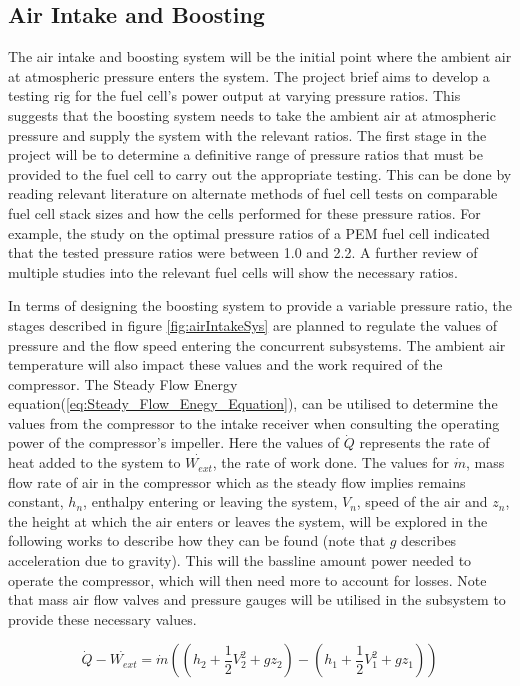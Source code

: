 \documentclass[a4paper,11pt]{article}
\begin{document}
\subsection{Air Intake and Boosting}
The air intake and boosting system will be the initial point where the ambient air at atmospheric pressure enters the system. The project brief aims to develop a testing rig for the fuel cell's power output at varying pressure ratios. This suggests that the boosting system needs to take the ambient air at atmospheric pressure and supply the system with the relevant ratios. The first stage in the project will be to determine a definitive range of pressure ratios that must be provided to the fuel cell to carry out the appropriate testing. This can be done by reading relevant literature on alternate methods of fuel cell tests on comparable fuel cell stack sizes and how the cells performed for these pressure ratios. For example, the study on the optimal pressure ratios of a PEM fuel cell\cite{hoeflinger2020air} indicated that the tested pressure ratios were between 1.0 and 2.2. A further review of multiple studies into the relevant fuel cells will show the necessary ratios.

In terms of designing the boosting system to provide a variable pressure ratio, the stages described in figure \ref{fig:airIntakeSys} are planned to regulate the values of pressure and the flow speed entering the concurrent subsystems. The ambient air temperature will also impact these values and the work required of the compressor. The Steady Flow Energy equation(\ref{eq:Steady_Flow_Enegy_Equation}), can be utilised to determine the values from the compressor to the intake receiver when consulting the operating power of the compressor's impeller. Here the values of $\dot{Q}$ represents the rate of heat added to the system to $\dot{W_{ext}}$, the rate of work done. The values for $\dot{m}$, mass flow rate of air in the compressor which as the steady flow implies remains constant, $h_n$, enthalpy entering or leaving the system, $V_n$, speed of the air and $z_n$, the height at which the air enters or leaves the system, will be explored in the following works to describe how they can be found (note that $g$ describes acceleration due to gravity). This will the bassline amount power needed to operate the compressor, which will then need more to account for losses. Note that mass air flow valves and pressure gauges will be utilised in the subsystem to provide these necessary values. 

\begin{equation}\label{eq:Steady_Flow_Enegy_Equation}
        \dot{Q}-\dot{W_{ext}}=\dot{m}((h_{2}+\frac{1}{2}V_{2}^{2}+gz_{2})-(h_{1}+\frac{1}{2}V_{1}^{2}+gz_{1}))
\end{equation}
\end{document}
